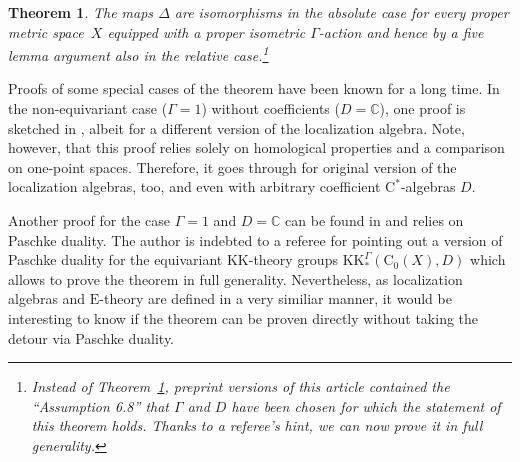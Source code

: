 \documentclass[11pt]{article}
\numberwithin{equation}{section}
\numberwithin{equation}{section}
\newtheorem{thm}{Theorem}[section]
\theoremstyle{definition}
\newcommand{\C}{\mathbb{C}}
\newcommand{\Ct}{\mathrm{C}}
\newcommand{\Cz}{\Ct_0}
\newcommand{\KK}{\mathrm{KK}}
\newcommand{\EE}{\mathrm{E}}
\newcommand{\textCstar}{\ensuremath{\mathrm{C}^*\!}}
\begin{document}
\begin{thm}\label{thm:Khomologydefinitions}
The maps $\Delta$ are isomorphisms in the absolute case for every proper metric space~$X$ equipped with a proper isometric $\Gamma$-action and hence by a five lemma argument also in the relative case.\footnote{Instead of Theorem~\ref{thm:Khomologydefinitions}, preprint versions of this article contained the ``Assumption 6.8'' that $\Gamma$ and $D$ have been chosen for which the statement of this theorem holds. Thanks to a referee's hint, we can now prove it in full generality.}
\end{thm}

Proofs of some special cases of the theorem have been known for a long time.
In the non-equivariant case ($\Gamma=1$) without coefficients ($D=\C$), one proof is sketched in \cite[Construction~6.7.5, Exercises~B.3.2 and~B.3.3]{WillettYuHigherIndexTheory}, albeit for a different version of the localization algebra. Note, however, that this proof relies solely on homological properties and a comparison on one-point spaces. Therefore, it goes through for original version of the localization algebras, too, and even with arbitrary coefficient \textCstar-algebras $D$.

Another proof for the case $\Gamma=1$ and $D=\C$ can be found in \cite[Proposition~4.3]{QiaoRoe} and relies on Paschke duality. The author is indebted to a referee for pointing out a version of Paschke duality for the equivariant $\KK$-theory groups $\KK^\Gamma_*(\Cz(X),D)$ which allows to prove the theorem in full generality.
Nevertheless, as localization algebras and $\EE$-theory are defined in a very similiar manner, it would be interesting to know if the theorem can be proven directly without taking the detour via Paschke duality.
\end{document}
